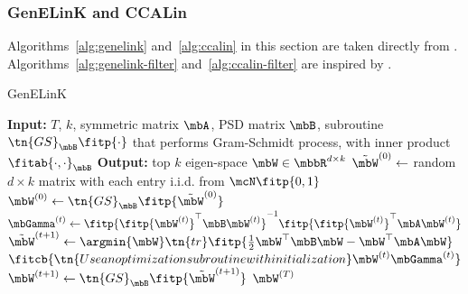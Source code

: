 \documentclass{article}
\begin{document}
	\subsubsection{GenELinK and CCALin} \label{subsubsec:genelinkandccalin}
	
	Algorithms~\ref{alg:genelink} and~\ref{alg:ccalin} in this section are taken directly from \cite{ge2016efficient}. Algorithms~\ref{alg:genelink-filter} and~\ref{alg:ccalin-filter} are inspired by \cite{ge2016efficient}.
	
	\begin{algorithm}
	\caption{GenELinK} \label{alg:genelink}
	\begin{algorithmic}[1]
	\STATE \textbf{Input:} $T$, $k$, symmetric matrix $\mbA$, PSD matrix $\mbB$, subroutine $\tn{GS}_{\mbB}\fitp{\cdot}$ that performs Gram-Schmidt process, with inner product $\fitab{\cdot,\cdot}_{\mbB}$
	\STATE \textbf{Output:} top $k$ eigen-space $\mbW \in \mbbR^{d \times k}$
	\STATE $\tilde{\mbW}^{(0)} \leftarrow$ random $d \times k$ matrix with each entry i.i.d. from $\mcN \fitp{0,1}$
	\STATE $\mbW^{(0)} \leftarrow \tn{GS}_{\mbB}\fitp{\tilde{\mbW}^{(0)}}$
	\STATE $\mbGamma^{(t)} \leftarrow \fitp{\fitp{\mbW^{(t)}}^{\top}\mbB\mbW^{(t)}}^{-1} \fitp{\fitp{\mbW^{(t)}}^{\top}\mbA\mbW^{(t)}}$
	\STATE $\tilde{\mbW}^{(t+1)} \leftarrow \argmin{\mbW} \tn{tr}\fitp{\frac{1}{2}\mbW^{\top}\mbB\mbW - \mbW^{\top}\mbA\mbW}$
	\STATE $\fitcb{\tn{Use an optimization subroutine with initialization } \mbW^{(t)}\mbGamma^{(t)}}$
	\STATE $\mbW^{(t+1)} \leftarrow \tn{GS}_{\mbB}\fitp{\tilde{\mbW}^{(t+1)}}$
	\ENDFOR
	\RETURN $\mbW^{(T)}$
	\end{algorithmic}
	\end{algorithm}
	
\end{document}
